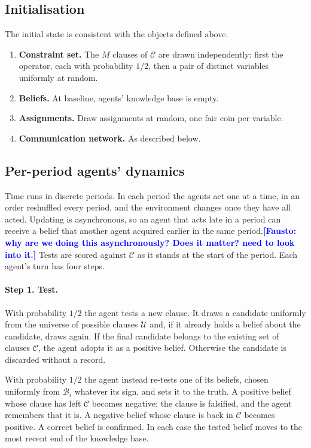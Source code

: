 \documentclass[11pt]{article}
\newcommand{\fausto}[1]{\textcolor{blue}{\textbf{[Fausto: #1]}}}
\begin{document}
\subsection{Initialisation}
The initial state is consistent with the objects defined above.

\begin{enumerate}
  \item \textbf{Constraint set.} The $M$ clauses of $\mathcal{C}$ are drawn independently: first the operator, each with probability $1/2$, then a pair of distinct variables uniformly at random.
  \item \textbf{Beliefs.} At baseline, agents' knowledge base is empty.
  \item \textbf{Assignments.} Draw assignments at random, one  fair coin per variable.
  \item \textbf{Communication network.} As described below.
\end{enumerate}



\subsection{Per-period agents' dynamics}

Time runs in discrete periods. In each period the agents act one at a time, in an order reshuffled every period, and the environment changes once they have all acted. Updating is asynchronous, so an agent that acts late in a period can receive a belief that another agent acquired earlier in the same period.\fausto{why are we doing this asynchronously? Does it matter? need to look into it.} Tests are scored against $\mathcal{C}$ as it stands at the start of the period. Each agent's turn has four steps.

\paragraph{Step 1. Test.} With probability $1/2$ the agent tests a new clause. It draws a candidate uniformly from the universe of possible clauses $\mathcal{U}$ and, if it already holds a belief about the candidate, draws again. If the final candidate belongs to the existing set of clauses $\mathcal{C}$, the agent adopts it as a positive belief. Otherwise the candidate is discarded without a record.

With probability $1/2$ the agent instead re-tests one of its beliefs, chosen uniformly from $\mathcal{B}_i$ whatever its sign, and sets it to the truth. A positive belief whose clause has left $\mathcal{C}$ becomes negative: the clause is falsified, and the agent remembers that it is. A negative belief whose clause is back in $\mathcal{C}$ becomes positive. A correct belief is confirmed. In each case the tested belief moves to the most recent end of the knowledge base.
\end{document}
